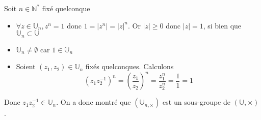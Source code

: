 \documentclass{article}
\begin{document}
Soit $n \in \mathbb{N}^{*}$ fixé quelconque
\begin{itemize}[label=$\star$]
  \item $\forall z \in \mathbb{U}_{n}, z^{n} = 1$ donc $1 = \lvert  z^{n} \rvert = \lvert z \rvert^{n}$. Or $\lvert z \rvert \geqslant 0$ donc $\lvert z \rvert = 1$, si bien que $\mathbb{U}_{n} \subset \mathbb{U}$

  \item $\mathbb{U}_{n} \neq \emptyset$ car $1 \in \mathbb{U}_{n}$

  \item Soient $(z_{1}, z_{2}) \in \mathbb{U}_{n}$ fixés quelconques.
        Calculons
        $$
          (z_{1}z_{2}^{-1})^{n} = \left( \frac{z_{1}}{z_{2}} \right)^{n} = \frac{z_{1}^{n}}{z_{2}^{n}} = \frac{1}{1} = 1
        $$
\end{itemize}
Donc $z_{1}z_{2}^{-1} \in \mathbb{U}_{n}$. On a donc montré que $(\mathbb{U}_{n, \times})$ est un sous-groupe de $(\mathbb{U}, \times)$.
\end{document}
